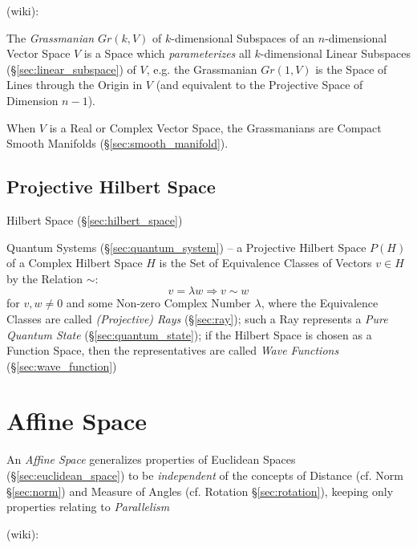(wiki):

The \emph{Grassmanian} $Gr(k,V)$ of $k$-dimensional Subspaces of an
$n$-dimensional Vector Space $V$ is a Space which \emph{parameterizes} all
$k$-dimensional Linear Subspaces (\S\ref{sec:linear_subspace}) of $V$, e.g.
the Grassmanian $Gr(1,V)$ is the Space of Lines through the Origin in $V$ (and
equivalent to the Projective Space of Dimension $n-1$).

When $V$ is a Real or Complex Vector Space, the Grassmanians are Compact Smooth
Manifolds (\S\ref{sec:smooth_manifold}).



\subsection{Projective Hilbert Space}\label{sec:projective_hilbert_space}

Hilbert Space (\S\ref{sec:hilbert_space})

\fist Quantum Systems (\S\ref{sec:quantum_system}) -- a
Projective Hilbert Space $P(H)$ of a Complex Hilbert Space $H$ is the Set of
Equivalence Classes of Vectors $v \in H$ by the Relation $\sim$:
\[
  v = \lambda w \Rightarrow v \sim w
\]
for $v,w \neq 0$ and some Non-zero Complex Number $\lambda$, where the
Equivalence Classes are called \emph{(Projective) Rays} (\S\ref{sec:ray}); such
a Ray represents a \emph{Pure Quantum State} (\S\ref{sec:quantum_state}); if the
Hilbert Space is chosen as a Function Space, then the representatives are called
\emph{Wave Functions} (\S\ref{sec:wave_function})



\section{Affine Space}\label{sec:affine_space}

An \emph{Affine Space} generalizes properties of Euclidean Spaces
(\S\ref{sec:euclidean_space}) to be \emph{independent} of the concepts of
Distance (cf. Norm \S\ref{sec:norm}) and Measure of Angles (cf. Rotation
\S\ref{sec:rotation}), keeping only properties relating to
\emph{Parallelism}

(wiki):

